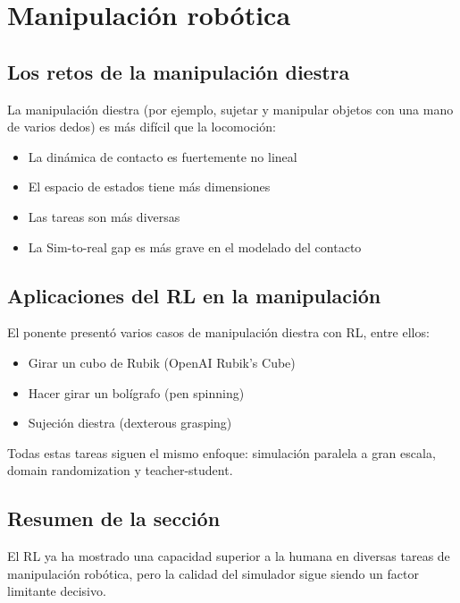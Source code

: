 \section{Manipulación robótica}

\subsection{Los retos de la manipulación diestra}

La manipulación diestra (por ejemplo, sujetar y manipular objetos con una mano de varios dedos) es más difícil que la locomoción:
\begin{itemize}
    \item La dinámica de contacto es fuertemente no lineal
    \item El espacio de estados tiene más dimensiones
    \item Las tareas son más diversas
    \item La Sim-to-real gap es más grave en el modelado del contacto
\end{itemize}

\subsection{Aplicaciones del RL en la manipulación}

El ponente presentó varios casos de manipulación diestra con RL, entre ellos:
\begin{itemize}
    \item Girar un cubo de Rubik (OpenAI Rubik's Cube)
    \item Hacer girar un bolígrafo (pen spinning)
    \item Sujeción diestra (dexterous grasping)
\end{itemize}

Todas estas tareas siguen el mismo enfoque: simulación paralela a gran escala, domain randomization y teacher-student.

\subsection{Resumen de la sección}

El RL ya ha mostrado una capacidad superior a la humana en diversas tareas de manipulación robótica, pero la calidad del simulador sigue siendo un factor limitante decisivo.

